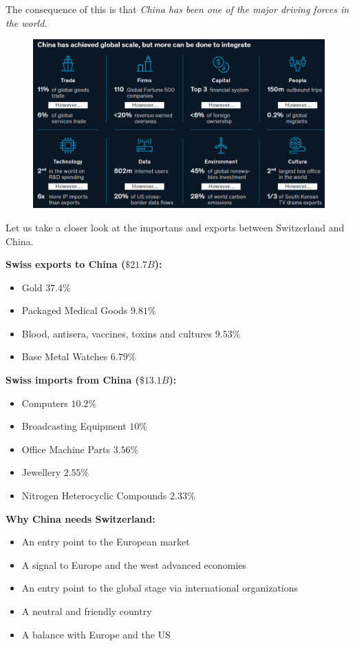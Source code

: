 \documentclass[a4paper]{extarticle}
\begin{document}
The consequence of this is that \textit{China has been one of the major driving forces in the world.}

\begin{figure}[H]
    \includegraphics[width=15cm]{../images/EnpRisk_Fig11-1}
    \centering
\end{figure}

Let us take a closer look at the importans and exports between Switzerland and China.

\textbf{Swiss exports to China ($\$21.7B$):}

\begin{itemize}
    \item Gold $37.4\%$
    \item Packaged Medical Goods $9.81\%$
    \item Blood, antisera, vaccines, toxins and cultures $9.53\%$
    \item Base Metal Watches $6.79\%$
\end{itemize}

\textbf{Swiss imports from China ($\$13.1B$):}

\begin{itemize}
    \item Computers $10.2\%$
    \item Broadcasting Equipment $10\%$
    \item Office Machine Parts $3.56\%$
    \item Jewellery $2.55\%$
    \item Nitrogen Heterocyclic Compounds $2.33\%$
\end{itemize}

\textbf{Why China needs Switzerland:}

\begin{itemize}
    \item An entry point to the European market
    \item A signal to Europe and the west advanced economies
    \item An entry point to the global stage via international organizations
    \item A neutral and friendly country
    \item A balance with Europe and the US
\end{itemize}
\end{document}
